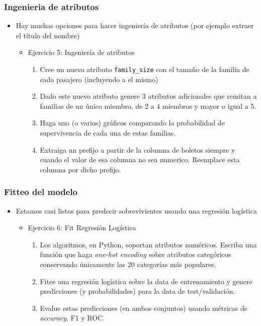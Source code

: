 \documentclass[leqno, 10pt, envcountsect]{beamer}
\numberwithin{equation}{section}
\theoremstyle{definition}
\theoremstyle{example}
\numberwithin{figure}{section}
\numberwithin{table}{section}
\let\olditem\item
\renewcommand{\item}{%
\olditem\vspace{1pt}}
\begin{document}
\begin{frame}
  \frametitle{Ingenieria de atributos}
    \begin{itemize}
      \item Hay muchas opciones para hacer ingeniería de atributos (por ejemplo
        extraer el título del nombre)
      \begin{itemize}
        \item Ejercicio 5: Ingeniería de atributos
          \begin{enumerate}
            \item Cree un nuevo atributo \texttt{family_size} con el tamaño de
              la familia de cada pasajero (incluyendo a el mismo)
                \item Dado este nuevo atributo genere 3 atributos adicionales
                  que remitan a familias de un único miembro, de 2 a 4 miembros
                  y mayor o igual a 5.
                \item Haga uno (o varios) gráficos comparando la probabilidad de
                  supervivencia de cada una de estas familias.
              \item Extraiga un prefijo a partir de la columna de boletos
                siempre y cuando el valor de esa columna no sea numerico.
                Reemplace esta columna por dicho prefijo.
          \end{enumerate}
      \end{itemize}
    \end{itemize}
\end{frame}
\begin{frame}
  \frametitle{Fitteo del modelo}
  \begin{itemize}
    \item Estamos casi listos para predecir sobrevivientes usando una regresión
      logística
      \begin{itemize}
        \item Ejercicio 6: Fit Regresión Logística
          \begin{enumerate}
            \item Los algoritmos, en Python, soportan atributos numéricos.
              Escriba una función que haga \textit{one-hot encoding} sobre
              atributos categóricos conservando únicamente las 20 categorías más
              populares.
            \item Fitee una regresión logística sobre la data de entrenamiento y
              genere predicciones (y probabilidades) para la data de test/validación.
            \item Evalue estas predicciones (en ambos conjuntos) usando métricas
              de \textit{accuracy}, F1 y ROC.
          \end{enumerate}
      \end{itemize}
  \end{itemize}
\end{frame}
\end{document}

